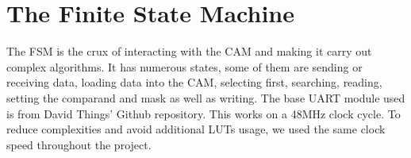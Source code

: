\section{The Finite State Machine}
The FSM is the crux of interacting with the CAM and making it carry out complex algorithms. 
It has numerous states, some of them are sending or receiving data, loading data into the CAM, selecting first, searching, reading, setting the comparand and mask as well as writing. 
The base UART module used is from David Things' Github repository. \cite{uart} This works on a 48MHz clock cycle.
To reduce complexities and avoid additional LUTs usage, we used the same clock speed throughout the project. 
